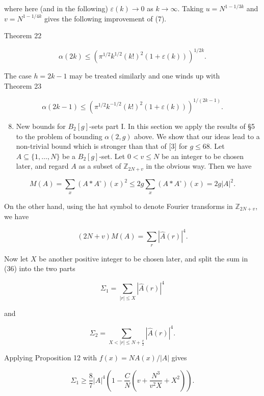 \documentclass[10pt]{article}
\begin{document}
where here (and in the following) $\varepsilon(k) \rightarrow 0$ as $k \rightarrow \infty$. Taking $u=N^{1-1 / 3 k}$ and $v=N^{1-1 / 4 k}$ gives the following improvement of (7).

Theorem 22

$$
\alpha(2 k) \leq\left(\pi^{1 / 2} k^{1 / 2}(k!)^{2}(1+\varepsilon(k))\right)^{1 / 2 k} .
$$

The case $h=2 k-1$ may be treated similarly and one winds up with\\
Theorem 23

$$
\alpha(2 k-1) \leq\left(\pi^{1 / 2} k^{-1 / 2}(k!)^{2}(1+\varepsilon(k))\right)^{1 /(2 k-1)} .
$$

\begin{enumerate}
  \setcounter{enumi}{7}
  \item New bounds for $B_{2}[g]$-sets part I. In this section we apply the results of §5 to the problem of bounding $\alpha(2, g)$ above. We show that our ideas lead to a non-trivial bound which is stronger than that of [3] for $g \leq 68$. Let $A \subseteq\{1, \ldots, N\}$ be a $B_{2}[g]$-set. Let $0<v \leq N$ be an integer to be chosen later, and regard $A$ as a subset of $\mathbb{Z}_{2 N+v}$ in the obvious way. Then we have
\end{enumerate}


\begin{equation*}
M(A)=\sum_{x}\left(A * A^{\circ}\right)(x)^{2} \leq 2 g \sum_{x}\left(A * A^{\circ}\right)(x)=2 g|A|^{2} . \tag{35}
\end{equation*}


On the other hand, using the hat symbol to denote Fourier transforms in $\mathbb{Z}_{2 N+v}$, we have


\begin{equation*}
(2 N+v) M(A)=\sum_{r}|\hat{A}(r)|^{4} . \tag{36}
\end{equation*}


Now let $X$ be another positive integer to be chosen later, and split the sum in (36) into the two parts

$$
\Sigma_{1}=\sum_{|r| \leq X}|\hat{A}(r)|^{4}
$$

and

$$
\Sigma_{2}=\sum_{X<|r| \leq N+\frac{v}{2}}|\hat{A}(r)|^{4} .
$$

Applying Proposition 12 with $f(x)=N A(x) /|A|$ gives


\begin{equation*}
\Sigma_{1} \geq \frac{8}{7}|A|^{4}\left(1-\frac{C}{N}\left(v+\frac{N^{3}}{v^{2} X}+X^{2}\right)\right) . \tag{37}
\end{equation*}
\end{document}
